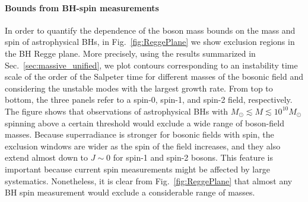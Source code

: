 \documentclass[11pt]{article}
\numberwithin{equation}{section} %
\begin{document}
\paragraph{Bounds from BH-spin measurements}
%
In order to quantify
the dependence of the boson mass bounds on the mass and spin of
astrophysical BHs, in Fig.~\ref{fig:ReggePlane} we show exclusion regions
in the BH Regge plane.
More precisely, using the results summarized in Sec.~\ref{sec:massive_unified}, we plot 
contours corresponding to an instability
time scale of the order of the Salpeter time for different masses
of the bosonic field and considering the unstable modes with the largest growth rate. From top to bottom, the three 
panels refer to a spin-0, spin-1, and spin-2 field, respectively.
%
The figure shows that observations of astrophysical BHs with $M_\odot\lesssim
M\lesssim 10^{10}M_\odot$ spinning above a certain threshold would exclude a wide range of boson-field masses. Because superradiance is 
stronger for bosonic fields with spin, the exclusion windows are wider as the spin of the field increases, and they also 
extend almost down to $J\sim0$ for spin-1 and spin-2 bosons. This feature is important because current spin measurements 
might be affected by large systematics. Nonetheless, it is clear from Fig.~\ref{fig:ReggePlane} that almost any BH spin 
measurement would exclude a considerable range of masses. 
\end{document}
